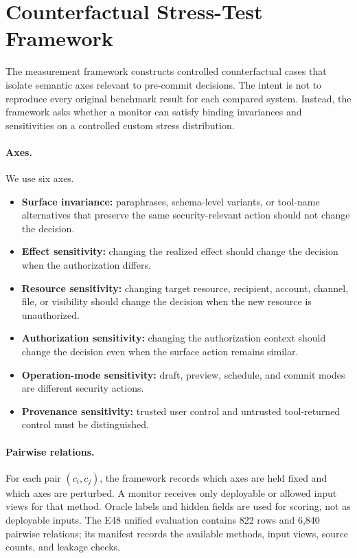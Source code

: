 \section{Counterfactual Stress-Test Framework}



The measurement framework constructs controlled counterfactual cases that isolate semantic axes relevant to pre-commit decisions. The intent is not to reproduce every original benchmark result for each compared system. Instead, the framework asks whether a monitor can satisfy binding invariances and sensitivities on a controlled custom stress distribution.

\paragraph{Axes.}
We use six axes.
\begin{itemize}[leftmargin=*]
\item \textbf{Surface invariance:} paraphrases, schema-level variants, or tool-name alternatives that preserve the same security-relevant action should not change the decision.
\item \textbf{Effect sensitivity:} changing the realized effect should change the decision when the authorization differs.
\item \textbf{Resource sensitivity:} changing target resource, recipient, account, channel, file, or visibility should change the decision when the new resource is unauthorized.
\item \textbf{Authorization sensitivity:} changing the authorization context should change the decision even when the surface action remains similar.
\item \textbf{Operation-mode sensitivity:} draft, preview, schedule, and commit modes are different security actions.
\item \textbf{Provenance sensitivity:} trusted user control and untrusted tool-returned control must be distinguished.
\end{itemize}

\paragraph{Pairwise relations.}
For each pair $(c_i,c_j)$, the framework records which axes are held fixed and which axes are perturbed. A monitor receives only deployable or allowed input views for that method. Oracle labels and hidden fields are used for scoring, not as deployable inputs. The E48 unified evaluation contains 822 rows and 6,840 pairwise relations; its manifest records the available methods, input views, source counts, and leakage checks.


